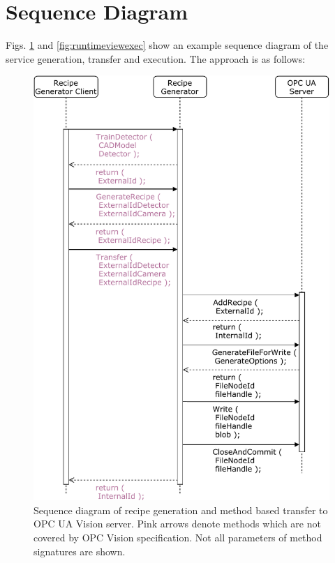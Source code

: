 \section{Sequence Diagram}
Figs. \ref{fig:runtimeviewgen} and \ref{fig:runtimeviewexec} show an example sequence diagram of the service generation, transfer and execution. The approach is as follows:
\begin{figure}
    \centering
    \includegraphics[height=0.9\textheight]{img/ConceptRuntimeView-RecipeGenerationAndTransfer.pdf}
    \caption[Sequence diagram recipe generation and method based transfer]{Sequence diagram of recipe generation and method based transfer to OPC UA Vision server. Pink arrows denote methods which are not covered by OPC Vision specification. Not all parameters of method signatures are shown.}
    \label{fig:runtimeviewgen}
\end{figure}

